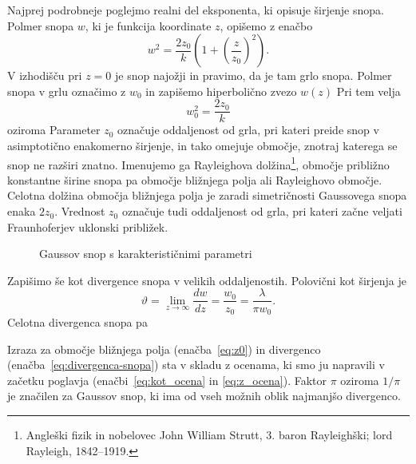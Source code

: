 Najprej podrobneje poglejmo realni del eksponenta, ki opisuje širjenje snopa. Polmer snopa $w$, 
ki je funkcija koordinate $z$, opišemo z enačbo 
\begin{equation}
w^{2}=\frac{2z_{0}}{k}\left(1+\left(\frac{z}{z_{0}}\right)^{2}\right).
\end{equation}
V izhodišču pri $z=0$ je snop najožji in pravimo, da je tam grlo snopa. 
Polmer snopa v grlu označimo z $w_0$ in zapišemo hiperbolično zvezo $w(z)$
Pri tem velja 
\begin{equation}
w_0^2 = \frac{2z_0}{k}
\end{equation}
oziroma 
Parameter $z_{0}$ označuje oddaljenost od grla, 
pri kateri preide snop v asimptotično enakomerno širjenje, in tako omejuje območje,
znotraj katerega se snop ne razširi znatno. Imenujemo ga 
Rayleighova dolžina\footnote{Angleški fizik in 
nobelovec John William Strutt, 3. baron Rayleighški; lord Rayleigh, 1842--1919.},
območje približno konstantne širine snopa pa območje bližnjega polja ali Rayleighovo
območje. Celotna dolžina 
območja bližnjega polja je zaradi simetričnosti Gaussovega snopa enaka $2z_0$. 
Vrednost $z_{0}$ označuje tudi oddaljenost od grla, pri kateri začne veljati 
Fraunhoferjev uklonski približek. 
\begin{figure}[h]
\centering
\def\svgwidth{120truemm} 

\caption{Gaussov snop s karakterističnimi parametri}
\label{fig:Gauss}
\end{figure}

Zapišimo še kot divergence snopa v velikih oddaljenostih. Polovični kot širjenja je
\begin{equation}
\vartheta=\lim_{z \to \infty} \frac{dw}{dz} = \frac{w_{0}}{z_{0}}=
\frac{\lambda}{\pi w_{0}}.\label{eq:divergenca-snopa}
\end{equation}
Celotna divergenca snopa pa

Izraza za območje bližnjega polja (enačba~\ref{eq:z0}) in divergenco 
(enačba~\ref{eq:divergenca-snopa}) sta v skladu z ocenama, ki smo ju 
napravili v začetku poglavja (enačbi~\ref{eq:kot_ocena} in \ref{eq:z_ocena}). Faktor
$\pi$ oziroma $1/\pi$ je značilen za Gaussov snop, ki ima od vseh možnih oblik 
najmanjšo divergenco. 

